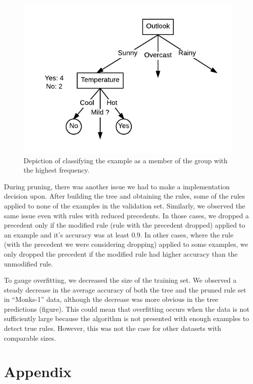 \documentclass[12pt]{article}
\begin{document}
\begin{figure}[H]
  \centering
  \includegraphics[scale=0.5]{img/majority_voting}
  \caption{Depiction of classifying the example as a member of the group with the highest frequency.}
  \label{fig:majority-vote}
\end{figure}

During pruning, there was another issue we had to make a
implementation decision upon. After building the tree and obtaining
the rules, some of the rules applied to none of the examples in the
validation set. Similarly, we observed the same issue even with rules
with reduced precedents. In those cases, we dropped a precedent only
if the modified rule (rule with the precedent dropped) applied to an
example and it's accuracy was at least $0.9$. In other cases, where the
rule (with the precedent we were considering dropping) applied to some
examples, we only dropped the precedent if the modified rule had
higher accuracy than the unmodified rule.

To gauge overfitting, we decreased the size of the training set. We
observed a steady decrease in the average accuracy of both the tree
and the pruned rule set in ``Monks-1'' data, although the decrease was
more obvious in the tree predictions (figure). This could mean that
overfitting occurs when the data is not sufficiently large because the
algorithm is not presented with enough examples to detect true
rules. However, this was not the case for other datasets with
comparable sizes.





\section{Appendix}
\end{document}

